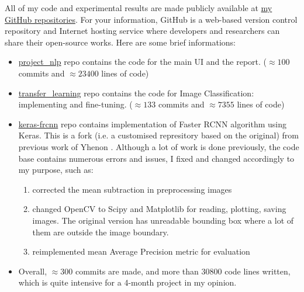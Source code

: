 All of my code and experimental results are made publicly available at  \href{https://github.com/vuhonganh?tab=repositories}{my GitHub repositories}. For your information, GitHub is a web-based version control repository and Internet hosting service where developers and researchers can share their open-source works. Here are some brief informations:
\begin{itemize}
	\item \href{https://github.com/vuhonganh/project_nlp}{project\_nlp} repo contains the code for the main UI and the report. ($\approx 100$ commits and $\approx 23400$ lines of code)
	\item \href{https://github.com/vuhonganh/transfer_learning}{transfer\_learning} repo contains the code for Image Classification: implementing and fine-tuning. ($\approx 133$ commits and $\approx 7355$ lines of code)
	\item \href{https://github.com/vuhonganh/keras-frcnn}{keras-frcnn} repo contains implementation of Faster RCNN algorithm using Keras. This is a fork (i.e. a customised represitory based on the original) from previous work of Yhenon \cite{kerasFrcnn}. Although a lot of work is done previously, the code base contains numerous errors and issues, I fixed and changed accordingly to my purpose, such as:
	\begin{enumerate}
		\item corrected the mean subtraction in preprocessing images
		\item changed OpenCV to Scipy and Matplotlib for reading, plotting, saving images. The original version has unreadable bounding box where a lot of them are outside the image boundary.
		\item reimplemented mean Average Precision metric for evaluation
	\end{enumerate}
	\item Overall, $\approx 300$ commits are made, and more than $30800$ code lines written, which is quite intensive for a 4-month project in my opinion.
\end{itemize}


